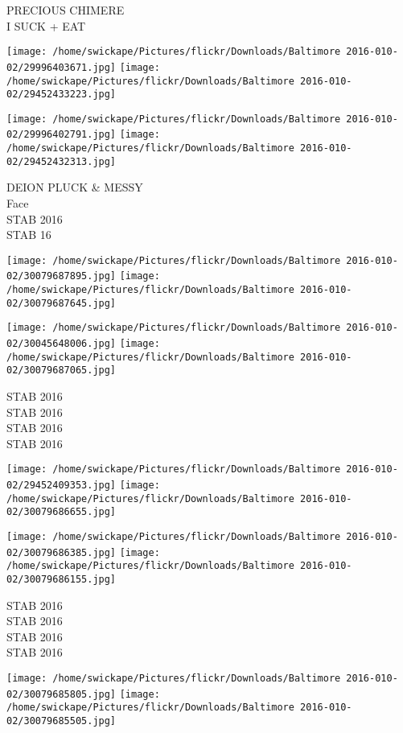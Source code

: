 \documentclass[10pt,letterpaper]{article}
\begin{document}
PRECIOUS CHIMERE\\
I SUCK + EAT\\
\pagebreak

\texttt{[image: /home/swickape/Pictures/flickr/Downloads/Baltimore 2016-010-02/29996403671.jpg]}
\texttt{[image: /home/swickape/Pictures/flickr/Downloads/Baltimore 2016-010-02/29452433223.jpg]}

\texttt{[image: /home/swickape/Pictures/flickr/Downloads/Baltimore 2016-010-02/29996402791.jpg]}
\texttt{[image: /home/swickape/Pictures/flickr/Downloads/Baltimore 2016-010-02/29452432313.jpg]}

DEION PLUCK \& MESSY\\
Face\\
STAB 2016\\
STAB 16\\
\pagebreak

\texttt{[image: /home/swickape/Pictures/flickr/Downloads/Baltimore 2016-010-02/30079687895.jpg]}
\texttt{[image: /home/swickape/Pictures/flickr/Downloads/Baltimore 2016-010-02/30079687645.jpg]}

\texttt{[image: /home/swickape/Pictures/flickr/Downloads/Baltimore 2016-010-02/30045648006.jpg]}
\texttt{[image: /home/swickape/Pictures/flickr/Downloads/Baltimore 2016-010-02/30079687065.jpg]}

STAB 2016\\
STAB 2016\\
STAB 2016\\
STAB 2016\\
\pagebreak

\texttt{[image: /home/swickape/Pictures/flickr/Downloads/Baltimore 2016-010-02/29452409353.jpg]}
\texttt{[image: /home/swickape/Pictures/flickr/Downloads/Baltimore 2016-010-02/30079686655.jpg]}

\texttt{[image: /home/swickape/Pictures/flickr/Downloads/Baltimore 2016-010-02/30079686385.jpg]}
\texttt{[image: /home/swickape/Pictures/flickr/Downloads/Baltimore 2016-010-02/30079686155.jpg]}

STAB 2016\\
STAB 2016\\
STAB 2016\\
STAB 2016\\
\pagebreak

\texttt{[image: /home/swickape/Pictures/flickr/Downloads/Baltimore 2016-010-02/30079685805.jpg]}
\texttt{[image: /home/swickape/Pictures/flickr/Downloads/Baltimore 2016-010-02/30079685505.jpg]}
\end{document}
